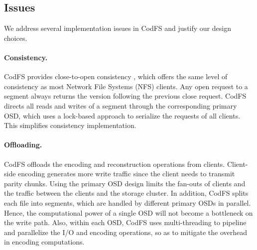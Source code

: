 
\subsection{Issues}
\label{sec:issues}

We address several implementation issues in CodFS and justify our design
choices. 

\paragraph{Consistency.} CodFS provides close-to-open consistency
\cite{howard88}, which offers the same level of consistency as most Network
File Systems (NFS) clients. Any open request to a segment always
returns the version following the previous close request. CodFS directs all
reads and writes of a segment through the corresponding primary OSD, which
uses a lock-based approach to serialize the requests of all clients.  This
simplifies consistency implementation. 

\paragraph{Offloading.} 
CodFS offloads the encoding and reconstruction operations from clients. 
Client-side encoding generates more write traffic 
since the client needs to transmit parity chunks.  Using the primary
OSD design limits the fan-outs of clients and the traffic between the
clients and the storage cluster.  In addition, CodFS splits each file into
segments, which are handled by different primary OSDs in parallel.  Hence, the
computational power of a single OSD will not become a bottleneck on the write
path.  Also, within each OSD, CodFS uses multi-threading to pipeline and
parallelize the I/O and encoding operations, so as to mitigate the overhead
in encoding computations. 

